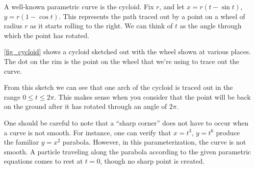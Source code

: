 \begin{example}\label{ex_cycloid}%
A well-known parametric curve is the cycloid.  Fix $r$, and let $x=r(t-\sin t)$, $y=r(1-\cos t)$.  This represents the path traced out by a point on a wheel of radius $r$ as it starts rolling to the right.  We can think of $t$ as the angle through which the point has rotated.
 
\noindent\begin{minipage}[t]{\linewidth}\noindent%
\captionsetup{type=figure}%
 \centering
 \caption{A cycloid traced through two revolutions.}
 \label{fig_cycloid}\tagstructend
\end{minipage}
 
\autoref{fig_cycloid} shows a cycloid sketched out with the wheel shown at various places.  The dot on the rim is the point on the wheel that we're using to trace out the curve.
 
From this sketch we can see that one arch of the cycloid is traced out in the range $0\le t\le2\pi$.  This makes sense when you consider that the point will be back on the ground after it has rotated through an angle of $2\pi$.
\end{example}

One should be careful to note that a ``sharp corner'' does not have to occur when a curve is not smooth. For instance, one can verify that $x=t^3$, $y=t^6$ produce the familiar $y=x^2$ parabola. However, in this parameterization, the curve is not smooth. A particle traveling along the parabola according to the given parametric equations comes to rest at $t=0$, though no sharp point is created.\bigskip

